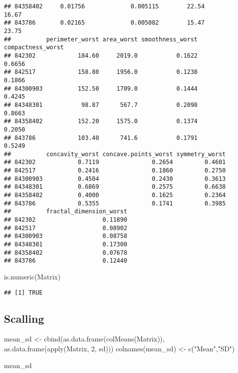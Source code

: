 \documentclass[
]{article}
\newenvironment{Shaded}{\begin{snugshade}}{\end{snugshade}}
\newcommand{\DecValTok}[1]{\textcolor[rgb]{0.00,0.00,0.81}{#1}}
\newcommand{\FunctionTok}[1]{\textcolor[rgb]{0.00,0.00,0.00}{#1}}
\newcommand{\NormalTok}[1]{#1}
\newcommand{\OtherTok}[1]{\textcolor[rgb]{0.56,0.35,0.01}{#1}}
\newcommand{\StringTok}[1]{\textcolor[rgb]{0.31,0.60,0.02}{#1}}
\begin{document}
\begin{verbatim}
## 84358402     0.01756             0.005115        22.54         16.67
## 843786       0.02165             0.005082        15.47         23.75
##          perimeter_worst area_worst smoothness_worst compactness_worst
## 842302            184.60     2019.0           0.1622            0.6656
## 842517            158.80     1956.0           0.1238            0.1866
## 84300903          152.50     1709.0           0.1444            0.4245
## 84348301           98.87      567.7           0.2098            0.8663
## 84358402          152.20     1575.0           0.1374            0.2050
## 843786            103.40      741.6           0.1791            0.5249
##          concavity_worst concave.points_worst symmetry_worst
## 842302            0.7119               0.2654         0.4601
## 842517            0.2416               0.1860         0.2750
## 84300903          0.4504               0.2430         0.3613
## 84348301          0.6869               0.2575         0.6638
## 84358402          0.4000               0.1625         0.2364
## 843786            0.5355               0.1741         0.3985
##          fractal_dimension_worst
## 842302                   0.11890
## 842517                   0.08902
## 84300903                 0.08758
## 84348301                 0.17300
## 84358402                 0.07678
## 843786                   0.12440
\end{verbatim}

\begin{Shaded}
\begin{Highlighting}[]
\FunctionTok{is.numeric}\NormalTok{(Matrix)}
\end{Highlighting}
\end{Shaded}

\begin{verbatim}
## [1] TRUE
\end{verbatim}

\hypertarget{scalling}{%
\subsection{Scalling}\label{scalling}}

\begin{Shaded}
\begin{Highlighting}[]
\NormalTok{mean\_sd }\OtherTok{\textless{}{-}} \FunctionTok{cbind}\NormalTok{(}\FunctionTok{as.data.frame}\NormalTok{(}\FunctionTok{colMeans}\NormalTok{(Matrix)),  }\FunctionTok{as.data.frame}\NormalTok{(}\FunctionTok{apply}\NormalTok{(Matrix, }\DecValTok{2}\NormalTok{, sd)))}
\FunctionTok{colnames}\NormalTok{(mean\_sd) }\OtherTok{\textless{}{-}} \FunctionTok{c}\NormalTok{(}\StringTok{"Mean"}\NormalTok{,}\StringTok{"SD"}\NormalTok{)}

\NormalTok{mean\_sd}
\end{Highlighting}
\end{Shaded}
\end{document}
